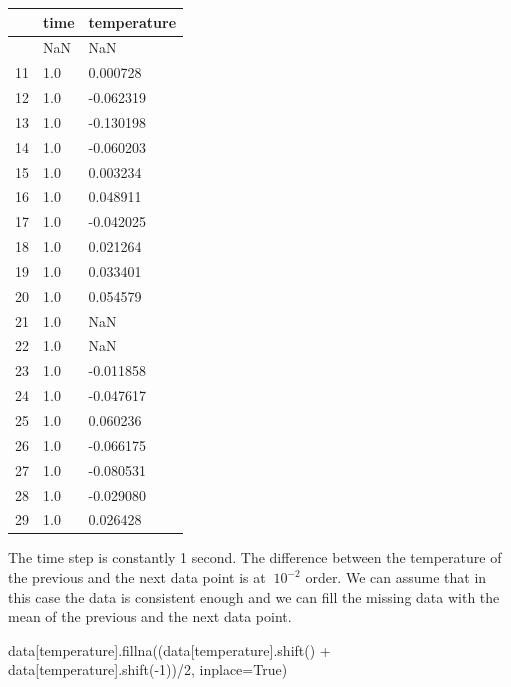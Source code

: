 \documentclass[
  letterpaper,
  DIV=11,
  numbers=noendperiod]{scrreprt}
\newenvironment{Shaded}{\begin{snugshade}}{\end{snugshade}}
\newcommand{\DecValTok}[1]{\textcolor[rgb]{0.68,0.00,0.00}{#1}}
\newcommand{\NormalTok}[1]{\textcolor[rgb]{0.00,0.23,0.31}{#1}}
\newcommand{\OperatorTok}[1]{\textcolor[rgb]{0.37,0.37,0.37}{#1}}
\newcommand{\StringTok}[1]{\textcolor[rgb]{0.13,0.47,0.30}{#1}}
\newcommand{\VariableTok}[1]{\textcolor[rgb]{0.07,0.07,0.07}{#1}}
\begin{document}
\begin{longtable}[]{@{}lll@{}}
\toprule\noalign{}
& time & temperature \\
\midrule\noalign{}
\endhead
\bottomrule\noalign{}
\endlastfoot
10 & NaN & NaN \\
11 & 1.0 & 0.000728 \\
12 & 1.0 & -0.062319 \\
13 & 1.0 & -0.130198 \\
14 & 1.0 & -0.060203 \\
15 & 1.0 & 0.003234 \\
16 & 1.0 & 0.048911 \\
17 & 1.0 & -0.042025 \\
18 & 1.0 & 0.021264 \\
19 & 1.0 & 0.033401 \\
20 & 1.0 & 0.054579 \\
21 & 1.0 & NaN \\
22 & 1.0 & NaN \\
23 & 1.0 & -0.011858 \\
24 & 1.0 & -0.047617 \\
25 & 1.0 & 0.060236 \\
26 & 1.0 & -0.066175 \\
27 & 1.0 & -0.080531 \\
28 & 1.0 & -0.029080 \\
29 & 1.0 & 0.026428 \\
\end{longtable}

The time step is constantly 1 second. The difference between the
temperature of the previous and the next data point is at \(~10^{-2}\)
order. We can assume that in this case the data is consistent enough and
we can fill the missing data with the mean of the previous and the next
data point.

\begin{Shaded}
\begin{Highlighting}[]
\NormalTok{data[}\StringTok{\textquotesingle{}temperature\textquotesingle{}}\NormalTok{].fillna((data[}\StringTok{\textquotesingle{}temperature\textquotesingle{}}\NormalTok{].shift() }\OperatorTok{+}\NormalTok{ data[}\StringTok{\textquotesingle{}temperature\textquotesingle{}}\NormalTok{].shift(}\OperatorTok{{-}}\DecValTok{1}\NormalTok{))}\OperatorTok{/}\DecValTok{2}\NormalTok{, inplace}\OperatorTok{=}\VariableTok{True}\NormalTok{)}
\end{Highlighting}
\end{Shaded}
\end{document}
